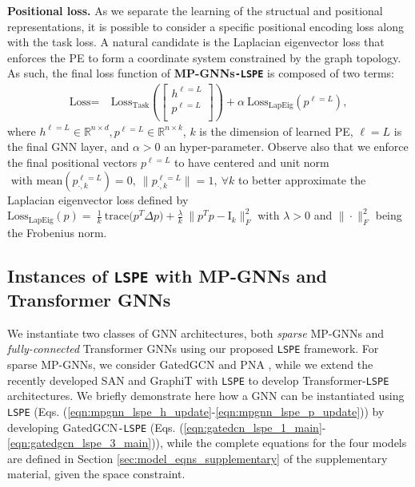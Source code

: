 \documentclass{article} \usepackage{iclr2021_conference,times}
\begin{document}
{\bf Positional loss.} As we separate the learning of the structual and positional representations, it is possible to consider a specific positional encoding loss along with the task loss. A natural candidate is the Laplacian eigenvector loss \citep{belkin2003laplacian, lai2014splitting} that enforces the PE to form a coordinate system constrained by the graph topology. As such, the final loss function of \textbf{MP-GNNs\texttt{-LSPE}} is composed of two terms:
\begin{align}
    \text{Loss} =& \ \text{Loss}_{\text{Task}}\left(\left[\!\!\begin{array}{c} h^{\ell=L} \\ p^{\ell=L} \\ \end{array}\!\!\right]\right)  + \alpha \  \text{Loss}_{\text{LapEig}}(p^{\ell=L}),\label{eqn:final_loss}
\end{align}
where $h^{\ell=L}\in \mathbb{R}^{n \times d}, p^{\ell=L}\in \mathbb{R}^{n \times k}$, $k$ is the dimension of learned PE, $\ell=L$ is the final GNN layer, and $\alpha>0$ an hyper-parameter. Observe also that we enforce the final positional vectors $p^{\ell=L}$ to have centered and unit norm $\textrm{ with }  \textrm{mean}(p^{\ell=L}_{\cdot,k})=0, \ \|p^{\ell=L}_{\cdot,k}\|=1, \ \forall k$ to better approximate the Laplacian eigenvector loss defined by $\text{Loss}_{\text{LapEig}}(p) = \ \frac{1}{k} \ \text{trace}\big(p^T \Delta p\big) + \frac{\lambda}{k} \ \big\|p^Tp - \textrm{I}_k \big\|_{F}^2$ with $\lambda>0$ and $\|\cdot\|^2_F$ being the Frobenius norm.




\subsection{Instances of \texttt{LSPE} with MP-GNNs and Transformer GNNs}
\label{sec:instances_lspe}

We instantiate two classes of GNN architectures, both \textit{sparse} MP-GNNs and \textit{fully-connected} Transformer GNNs using our proposed \texttt{LSPE} framework. For sparse MP-GNNs, we consider GatedGCN \citep{bresson2017residual} and PNA \citep{corso2020principal}, while we extend the recently developed SAN \citep{kreuzer2021rethinking} and GraphiT \citep{mialon2021graphit} with \texttt{LSPE} to develop Transformer-\texttt{LSPE} architectures.
We briefly demonstrate here how a GNN can be instantiated using \texttt{LSPE} (Eqs. (\ref{eqn:mpgnn_lspe_h_update}-\ref{eqn:mpgnn_lspe_p_update})) by developing GatedGCN\texttt{-LSPE} (Eqs. (\ref{eqn:gatedcn_lspe_1_main}-\ref{eqn:gatedgcn_lspe_3_main})), while the complete equations for the four models are defined in Section \ref{sec:model_eqns_supplementary} of the supplementary material, given the space constraint.
\end{document}
